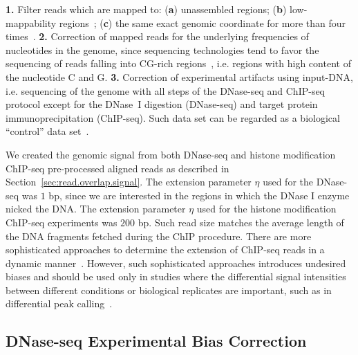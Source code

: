 \vspace{0.3cm}
\noindent
\textbf{1.} Filter reads which are mapped to: (\textbf{a}) unassembled regions; (\textbf{b}) low-mappability regions~\cite{derrien2012}; (\textbf{c}) the same exact genomic coordinate for more than four times~\cite{boyle2011}.
\noindent
\textbf{2.} Correction of mapped reads for the underlying frequencies of nucleotides in the genome, since sequencing technologies tend to favor the sequencing of reads falling into CG-rich regions~\cite{ashoor2013}, i.e. regions with high content of the nucleotide C and G.
\noindent
\textbf{3.} Correction of experimental artifacts using input-DNA, i.e. sequencing of the genome with all steps of the DNase-seq and ChIP-seq protocol except for the DNase~I digestion (DNase-seq) and target protein immunoprecipitation (ChIP-seq). Such data set can be regarded as a biological ``control'' data set~\cite{diaz2012}.
\vspace{0.3cm}

We created the genomic signal from both DNase-seq and histone modification ChIP-seq pre-processed aligned reads as described in Section~\ref{sec:read.overlap.signal}. The extension parameter $\eta$ used for the DNase-seq was $1$ bp, since we are interested in the regions in which the DNase I enzyme nicked the DNA. The extension parameter $\eta$ used for the histone modification ChIP-seq experiments was $200$ bp. Such read size matches the average length of the DNA fragments fetched during the ChIP procedure. There are more sophisticated approaches to determine the extension of ChIP-seq reads in a dynamic manner~\cite{mammana2013}. However, such sophisticated approaches introduces undesired biases and should be used only in studies where the differential signal intensities between different conditions or biological replicates are important, such as in differential peak calling~\cite{allhoff2014}.

\subsection{DNase-seq Experimental Bias Correction}
\label{sec:dnase.experimental.bias.correction}

